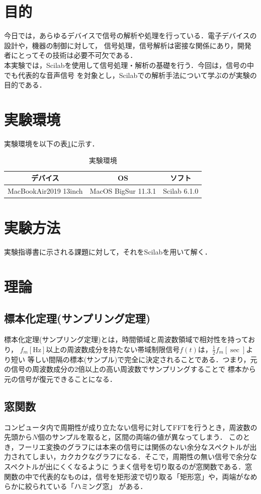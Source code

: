 \documentclass[a4paper,11pt]{jsarticle}
\begin{document}
\section{目的}
  今日では，あらゆるデバイスで信号の解析や処理を行っている．電子デバイスの設計や，機器の制御に対して，
  信号処理，信号解析は密接な関係にあり，開発者にとってその技術は必要不可欠である．\\
  本実験では，Scilabを使用して信号処理・解析の基礎を行う．今回は，信号の中でも代表的な音声信号
  を対象とし，Scilabでの解析手法について学ぶのが実験の目的である．


\section{実験環境}
  実験環境を以下の表\ref{T:emviroment}に示す．
  \begin{table}[H]
    \begin{center}
      \caption{実験環境}
      \begin{tabular}{|c|c|c|}  \hline 
        デバイス &  OS & ソフト \\ \hline 
        MacBookAir2019 13inch &  MacOS BigSur 11.3.1 & Scilab 6.1.0 \\ \hline
      \end{tabular}
      \label{T:emviroment}
    \end{center}
  \end{table}

\section{実験方法}
  実験指導書\cite{text}に示される課題に対して，それをScilabを用いて解く．

\section{理論}
  \subsection{標本化定理(サンプリング定理)}
    標本化定理(サンプリング定理)\cite{sampling}とは，時間領域と周波数領域で相対性を持っており，
    $f_m[\si{\hertz}]$以上の周波数成分を持たない帯域制限信号$f(t)$は，$\frac{1}{2}f_m[\si{\sec}]$より短い
    等しい間隔の標本(サンプル)で完全に決定されることである．つまり，元の信号の周波数成分の2倍以上の高い周波数でサンプリングすることで
    標本から元の信号が復元できることになる．

  \subsection{窓関数}
    コンピュータ内で周期性が成り立たない信号に対してFFTを行うとき，周波数の先頭から$N$個のサンプルを取ると，区間の両端の値が異なってしまう．
    このとき，フーリエ変換のグラフには本来の信号には関係のない余分なスペクトルが出力されてしまい，カクカクなグラフになる．そこで，周期性の無い信号で余分なスペクトルが出にくくなるように
    うまく信号を切り取るのが窓関数\cite{window}である．窓関数の中で代表的なものは，信号を矩形波で切り取る「矩形窓」や，両端がなめらかに絞られている「ハミング窓」
    がある．
\end{document}
